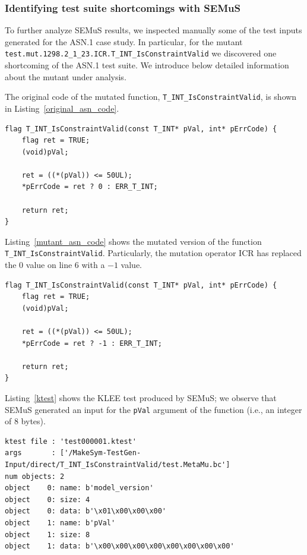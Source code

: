 \subsubsection{Identifying test suite shortcomings with SEMuS}
\label{sec:shortcoming:semus}

To further analyze SEMuS results, we inspected manually some of the test inputs generated for the ASN.1 case study.
In particular, for the mutant \texttt{test.mut.1298.2\_1\_23.ICR.T\_INT\_IsConstraintValid} we discovered one shortcoming of the ASN.1 test suite. We introduce below detailed information about the mutant under analysis.

The original code of the mutated function, \texttt{T\_INT\_IsConstraintValid}, is shown in Listing~\ref{original_asn_code}.

\begin{lstlisting}[style=CStyle, float=t, caption=Original code., label=original_asn_code]
flag T_INT_IsConstraintValid(const T_INT* pVal, int* pErrCode) {
    flag ret = TRUE;
    (void)pVal;

    ret = ((*(pVal)) <= 50UL);
    *pErrCode = ret ? 0 : ERR_T_INT; 

    return ret;
}
\end{lstlisting}

Listing~\ref{mutant_asn_code} shows the mutated version of the function \texttt{T\_INT\_IsConstraintValid}. Particularly, the mutation operator ICR has replaced the $0$ value on line 6 with a $-1$ value.

\begin{lstlisting}[style=CStyle, float=t, caption=Mutant code., label=mutant_asn_code]
flag T_INT_IsConstraintValid(const T_INT* pVal, int* pErrCode) {
    flag ret = TRUE;
    (void)pVal;

    ret = ((*(pVal)) <= 50UL);
    *pErrCode = ret ? -1 : ERR_T_INT;

    return ret;
}
\end{lstlisting}


Listing~\ref{ktest} shows the KLEE test produced by SEMuS; we observe that SEMuS generated an input for the \texttt{pVal} argument of the function (i.e., an integer of 8 bytes).

\begin{lstlisting}[language={}, float=t, caption=Klee-test output, label=ktest]
ktest file : 'test000001.ktest'
args       : ['/MakeSym-TestGen-Input/direct/T_INT_IsConstraintValid/test.MetaMu.bc']
num objects: 2
object    0: name: b'model_version'
object    0: size: 4
object    0: data: b'\x01\x00\x00\x00'
object    1: name: b'pVal'
object    1: size: 8
object    1: data: b'\x00\x00\x00\x00\x00\x00\x00\x00'
\end{lstlisting}

